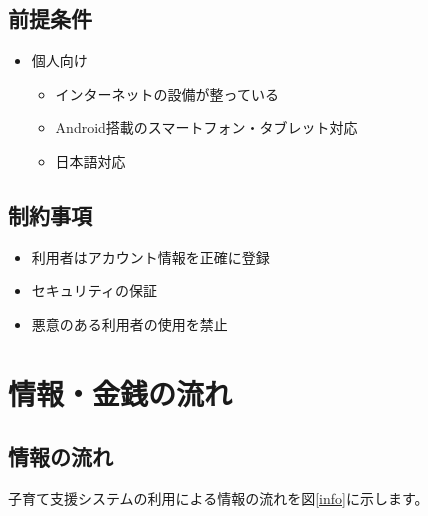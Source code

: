 \documentclass[a4j]{jarticle}
\begin{document}
\subsection{前提条件}
\begin{itemize}
  \item 個人向け
  \begin{itemize}
    \item インターネットの設備が整っている
　   \item Android搭載のスマートフォン・タブレット対応
　   \item 日本語対応
  \end{itemize}
\end{itemize}

\subsection{制約事項}

\begin{itemize}
\item 利用者はアカウント情報を正確に登録
\item セキュリティの保証
\item 悪意のある利用者の使用を禁止

\end{itemize}

\section{情報・金銭の流れ}

\subsection{情報の流れ}
子育て支援システムの利用による情報の流れを図\ref{info}に示します。		%
\end{document}
